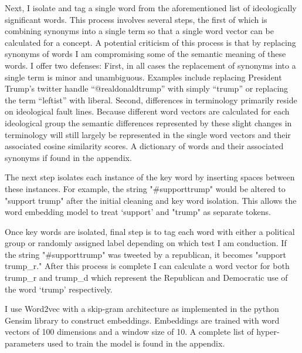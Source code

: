 \documentclass[../embeddings.tex]{subfiles}
\begin{document}
Next, I isolate and tag a single word from the aforementioned list of ideologically significant words. This process involves several steps, the first of which is combining synonyms into a single term so that a single word vector can be calculated for a concept. A potential criticism of this process is that by replacing synonyms of words I am compromising some of the semantic meaning of these words. I offer two defenses: First, in all cases the replacement of synonyms into a single term is minor and unambiguous. Examples include replacing President Trump’s twitter handle “@realdonaldtrump” with simply “trump” or replacing the term “leftist” with liberal. Second, differences in terminology primarily reside on ideological fault lines. Because different word vectors are calculated for each ideological group the semantic differences represented by these slight changes in terminology will still largely be represented in the single word vectors and their associated cosine similarity scores. A dictionary of words and their associated synonyms if found in the appendix.

The next step isolates each instance of the key word by inserting spaces between these instances. For example, the string "\#supporttrump" would be altered to "support trump" after the initial cleaning and key word isolation. This allows the word embedding model to treat ‘support’ and "trump" as separate tokens. 

Once key words are isolated, final step is to tag each word with either a political group or randomly assigned label depending on which test I am conduction. If the string "\#supporttrump" was tweeted by a republican, it becomes "support trump\_r." After this process is complete I can calculate a word vector for both trump\_r and trump\_d which represent the Republican and Democratic use of the word ‘trump’ respectively.	

I use Word2vec with a skip-gram architecture as implemented in the python Gensim library to construct embeddings. Embeddings are trained with word vectors of 100 dimensions and a window size of 10. A complete list of hyper-parameters used to train the model is found in the appendix.
\end{document}

